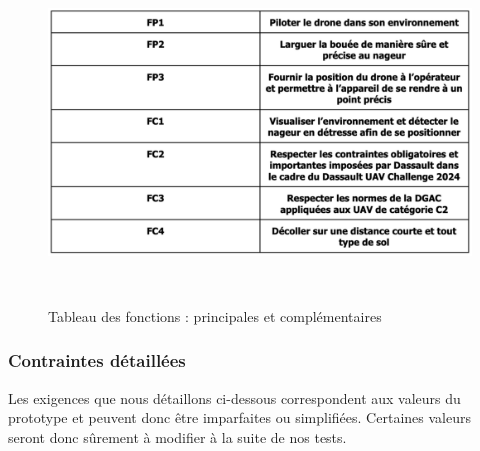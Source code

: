 \documentclass[a4paper,12pt,french]{report}
\begin{document}
\begin{figure}[h]
    \centering
    \includegraphics[height=9cm]{figures/fonctions.png}
    \caption{Tableau des fonctions : principales et complémentaires}
    \label{fonctions}
\end{figure}

\newpage
\subsubsection*{Contraintes détaillées}

Les exigences que nous détaillons ci-dessous correspondent aux valeurs du prototype et peuvent donc être imparfaites ou simplifiées. Certaines valeurs seront donc sûrement à modifier à la suite de nos tests.
\end{document}
